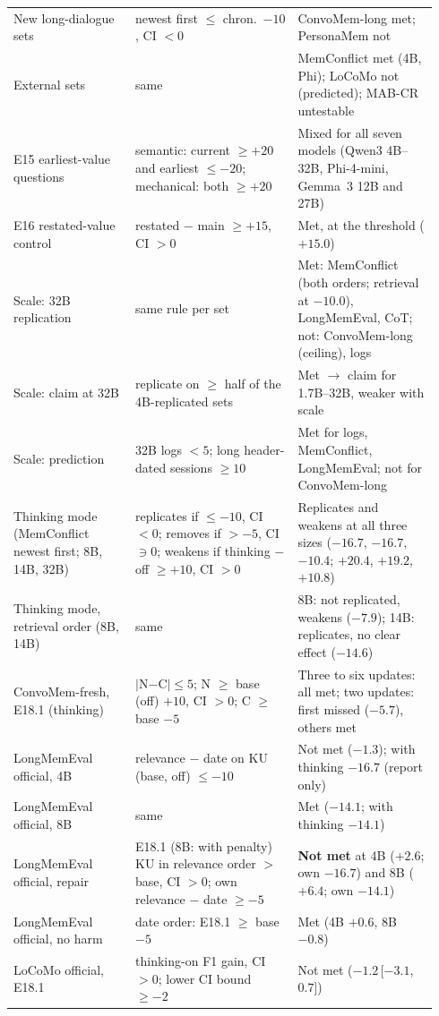 \documentclass[11pt]{article}
\newcommand{\ci}[2]{\,[$#1$,\,$#2$]}
\begin{document}
{\begin{longtable}{@{}>{\raggedright\arraybackslash}p{0.27\linewidth}>{\raggedright\arraybackslash}p{0.36\linewidth}>{\raggedright\arraybackslash}p{0.31\linewidth}@{}}
New long-dialogue sets & newest first $\leq$ chron.\ $-10$, CI $<0$ & ConvoMem-long met; PersonaMem not \\
External sets & same & MemConflict met (4B, Phi); LoCoMo not (predicted); MAB-CR untestable \\
E15 earliest-value questions & semantic: current $\geq+20$ and earliest $\leq-20$; mechanical: both $\geq+20$ & Mixed for all seven models (Qwen3 4B--32B, Phi-4-mini, Gemma~3 12B and 27B) \\
E16 restated-value control & restated $-$ main $\geq+15$, CI $>0$ & Met, at the threshold ($+15.0$) \\
Scale: 32B replication & same rule per set & Met: MemConflict (both orders; retrieval at $-10.0$), LongMemEval, CoT; not: ConvoMem-long (ceiling), logs \\
Scale: claim at 32B & replicate on $\geq$ half of the 4B-replicated sets & Met $\rightarrow$ claim for 1.7B--32B, weaker with scale \\
Scale: prediction & 32B logs $<5$; long header-dated sessions $\geq10$ & Met for logs, MemConflict, LongMemEval; not for ConvoMem-long \\
Thinking mode (MemConflict newest first; 8B, 14B, 32B) & replicates if $\leq-10$, CI $<0$; removes if $>-5$, CI $\ni 0$; weakens if thinking $-$ off $\geq+10$, CI $>0$ & Replicates and weakens at all three sizes ($-16.7$, $-16.7$, $-10.4$; $+20.4$, $+19.2$, $+10.8$) \\
Thinking mode, retrieval order (8B, 14B) & same & 8B: not replicated, weakens ($-7.9$); 14B: replicates, no clear effect ($-14.6$) \\
ConvoMem-fresh, E18.1 (thinking) & $|$N$-$C$|\leq5$; N $\geq$ base (off) $+10$, CI $>0$; C $\geq$ base $-5$ & Three to six updates: all met; two updates: first missed ($-5.7$), others met \\
LongMemEval official, 4B & relevance $-$ date on KU (base, off) $\leq-10$ & Not met ($-1.3$); with thinking $-16.7$ (report only) \\
LongMemEval official, 8B & same & Met ($-14.1$; with thinking $-14.1$) \\
LongMemEval official, repair & E18.1 (8B: with penalty) KU in relevance order $>$ base, CI $>0$; own relevance $-$ date $\geq-5$ & \textbf{Not met} at 4B ($+2.6$; own $-16.7$) and 8B ($+6.4$; own $-14.1$) \\
LongMemEval official, no harm & date order: E18.1 $\geq$ base $-5$ & Met (4B $+0.6$, 8B $-0.8$) \\
LoCoMo official, E18.1 & thinking-on F1 gain, CI $>0$; lower CI bound $\geq-2$ & Not met ($-1.2$\ci{-3.1}{0.7}) \\

\end{longtable}}
\end{document}
